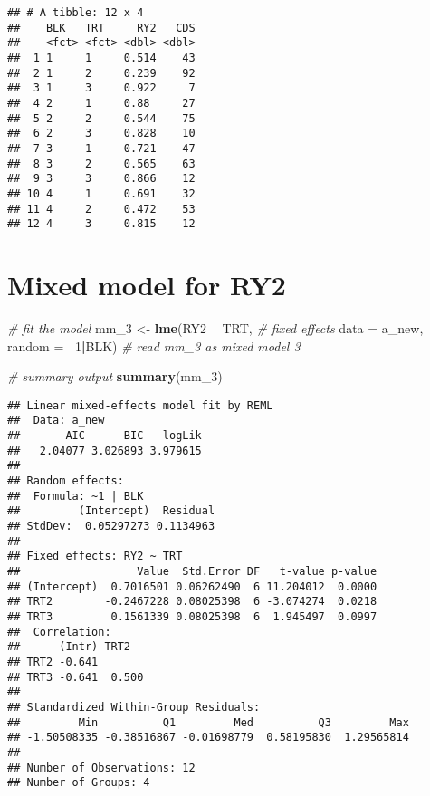 \documentclass[]{book}
\newenvironment{Shaded}{\begin{snugshade}}{\end{snugshade}}
\newcommand{\CommentTok}[1]{\textcolor[rgb]{0.56,0.35,0.01}{\textit{#1}}}
\newcommand{\DataTypeTok}[1]{\textcolor[rgb]{0.13,0.29,0.53}{#1}}
\newcommand{\DecValTok}[1]{\textcolor[rgb]{0.00,0.00,0.81}{#1}}
\newcommand{\KeywordTok}[1]{\textcolor[rgb]{0.13,0.29,0.53}{\textbf{#1}}}
\newcommand{\NormalTok}[1]{#1}
\newcommand{\OperatorTok}[1]{\textcolor[rgb]{0.81,0.36,0.00}{\textbf{#1}}}
\newcommand{\StringTok}[1]{\textcolor[rgb]{0.31,0.60,0.02}{#1}}
\begin{document}
\begin{verbatim}
## # A tibble: 12 x 4
##    BLK   TRT     RY2   CDS
##    <fct> <fct> <dbl> <dbl>
##  1 1     1     0.514    43
##  2 1     2     0.239    92
##  3 1     3     0.922     7
##  4 2     1     0.88     27
##  5 2     2     0.544    75
##  6 2     3     0.828    10
##  7 3     1     0.721    47
##  8 3     2     0.565    63
##  9 3     3     0.866    12
## 10 4     1     0.691    32
## 11 4     2     0.472    53
## 12 4     3     0.815    12
\end{verbatim}

\hypertarget{mixed-model-for-ry2}{%
\section{Mixed model for RY2}\label{mixed-model-for-ry2}}

\begin{Shaded}
\begin{Highlighting}[]
\CommentTok{# fit the model  }
\NormalTok{mm_}\DecValTok{3}\NormalTok{ <-}\StringTok{ }\KeywordTok{lme}\NormalTok{(RY2 }\OperatorTok{~}\StringTok{ }\NormalTok{TRT, }\CommentTok{# fixed effects}
            \DataTypeTok{data =}\NormalTok{ a_new,}
            \DataTypeTok{random =} \OperatorTok{~}\DecValTok{1}\OperatorTok{|}\NormalTok{BLK) }\CommentTok{# read mm_3 as mixed model 3}

\CommentTok{# summary output}
\KeywordTok{summary}\NormalTok{(mm_}\DecValTok{3}\NormalTok{)}
\end{Highlighting}
\end{Shaded}

\begin{verbatim}
## Linear mixed-effects model fit by REML
##  Data: a_new 
##       AIC      BIC   logLik
##   2.04077 3.026893 3.979615
## 
## Random effects:
##  Formula: ~1 | BLK
##         (Intercept)  Residual
## StdDev:  0.05297273 0.1134963
## 
## Fixed effects: RY2 ~ TRT 
##                  Value  Std.Error DF   t-value p-value
## (Intercept)  0.7016501 0.06262490  6 11.204012  0.0000
## TRT2        -0.2467228 0.08025398  6 -3.074274  0.0218
## TRT3         0.1561339 0.08025398  6  1.945497  0.0997
##  Correlation: 
##      (Intr) TRT2  
## TRT2 -0.641       
## TRT3 -0.641  0.500
## 
## Standardized Within-Group Residuals:
##         Min          Q1         Med          Q3         Max 
## -1.50508335 -0.38516867 -0.01698779  0.58195830  1.29565814 
## 
## Number of Observations: 12
## Number of Groups: 4
\end{verbatim}
\end{document}
